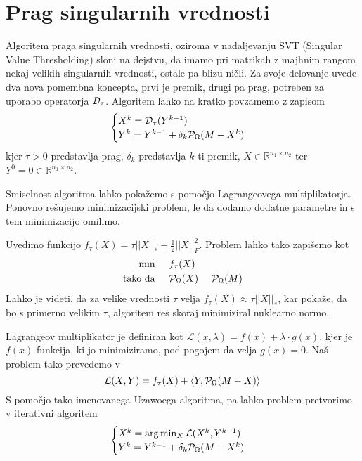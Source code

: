\section{Prag singularnih vrednosti}
Algoritem praga singularnih vrednosti, oziroma v nadaljevanju SVT (Singular Value Thresholding) sloni na dejstvu, da imamo pri matrikah z majhnim rangom nekaj velikih singularnih vrednosti, ostale pa blizu ničli. Za svoje delovanje uvede dva nova pomembna koncepta, prvi je premik, drugi pa prag, potreben za uporabo operatorja $\mathcal{D}_\tau$. Algoritem lahko na kratko povzamemo z zapisom
\[
    \begin{cases}
        X^k = \mathcal{D}_\tau(Y^{k-1}) \\
        Y^k = Y^{k-1} + \delta_k \mathcal{P}_\Omega(M - X^k) 
    \end{cases}
\]
kjer $\tau > 0$ predstavlja prag, $\delta_k$ predstavlja $k$-ti premik, $X \in \mathbb{R}^{n_1 \times n_2}$ ter
$Y^0 = 0 \in \mathbb{R}^{n_1 \times n_2}$. \cite{CCS}

Smiselnost algoritma lahko pokažemo s pomočjo Lagrangeovega multiplikatorja. Ponovno rešujemo minimizacijski problem, le da dodamo dodatne parametre in s tem minimizacijo omilimo. 

Uvedimo funkcijo $f_\tau(X) = \tau||X||_* + \frac{1}{2}||X||^2_F$. Problem lahko tako zapišemo kot 
\begin{align}
\label{2706-0957}
\begin{split}
    \textrm{min} & \hspace{0.5cm} f_\tau(X) \\
    \textrm{tako da} & \hspace{0.5cm} \mathcal{P}_\Omega(X) = \mathcal{P}_\Omega(M)
\end{split}
\end{align}
Lahko je videti, da za velike vrednosti $\tau$ velja $f_\tau(X) \approx \tau||X||_*$, kar pokaže, da bo s primerno velikim $\tau$, algoritem res skoraj minimiziral nuklearno normo.

Lagrangeov multiplikator je definiran kot $\mathcal{L}(x, \lambda) = f(x) + \lambda \cdot g(x)$, kjer je $f(x)$ funkcija, ki jo minimiziramo, pod pogojem da velja $g(x) = 0$. Naš problem tako prevedemo v
\[
    \mathcal{L}(X, Y) = f_\tau(X) + \left< Y, \mathcal{P}_\Omega(M - X) \right>
\] 
S pomočjo tako imenovanega Uzawoega algoritma, pa lahko problem pretvorimo v iterativni algoritem 
\[
    \begin{cases}
        X^k =  \arg \min_{X} \mathcal{L}(X^k, Y^{k-1}) \\
        Y^k = Y^{k-1} + \delta_k \mathcal{P}_\Omega(M - X^k) 
    \end{cases}
\] \cite{CCS}


